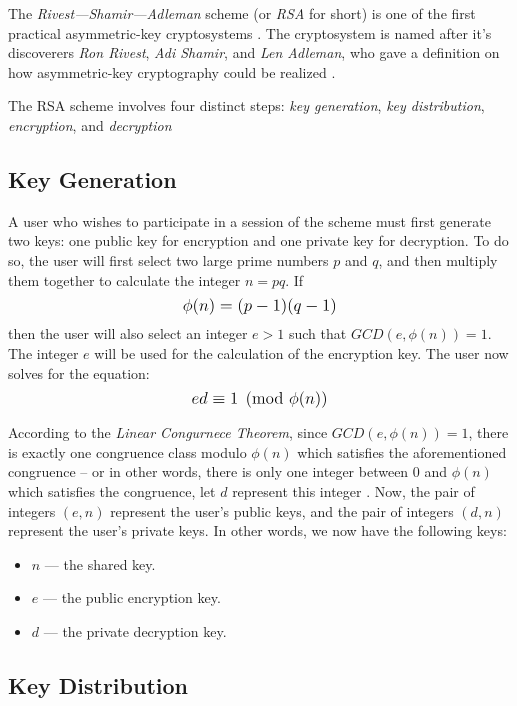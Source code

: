 The \textit{Rivest---Shamir---Adleman} scheme (or \textit{RSA} for short) is one of the first practical asymmetric-key cryptosystems \cite{classical_algebra}. 
The cryptosystem is named after it's discoverers \textit{Ron Rivest}, \textit{Adi Shamir}, and \textit{Len Adleman}, who gave a definition on how 
asymmetric-key cryptography could be realized \cite{classical_algebra}.

The RSA scheme involves four distinct steps: \textit{key generation}, \textit{key distribution}, \textit{encryption}, and \textit{decryption}

\subsection{Key Generation}

A user who wishes to participate in a session of the scheme must first generate two keys: one public key for encryption and one private key for decryption. To do so,
the user will first select two large prime numbers $p$ and $q$, and then multiply them together to calculate the integer $n = pq$. 
If $$\mathlarger{\phi(n) = (p-1)(q-1)}$$ then the user will also select an integer $e > 1$ such that $GCD(e,\phi(n))=1$. 
The integer $e$ will be used for the calculation of the encryption key. The user now solves for the equation: $$\mathlarger{ed \equiv 1 \pmod{\phi(n)}}$$

According to the \textit{Linear Congurnece Theorem}, since $GCD(e,\phi(n))=1$, there is exactly one congruence class modulo $\phi(n)$ which satisfies the aforementioned
congruence -- or in other words, there is only one integer between $0$ and $\phi(n)$ which satisfies the congruence, let $d$ represent this integer 
\cite{classical_algebra}. Now, the pair of integers $(e,n)$ represent the user's public keys, and the pair of integers $(d,n)$ represent the user's private keys. 
In other words, we now have the following keys:

\begin{itemize}
    \item $n$ --- the shared key.
    \item $e$ --- the public encryption key.
    \item $d$ --- the private decryption key.
\end{itemize}

\subsection{Key Distribution}


